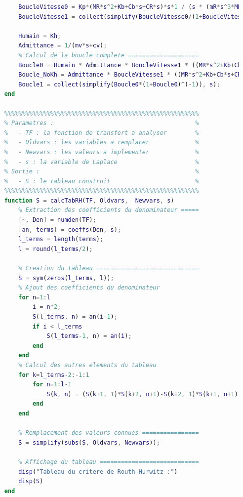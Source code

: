 \documentclass[a4paper,12pt]{article}
\begin{document}
\begin{lstlisting}[caption={Fichier de calculs des plages de $K_p$ et $K_H$}, language=Matlab]
        % Calcul de la boucle de vitesse ==================
        BoucleVitesse0 = Kp*(MR*s^2+Kb+Cb*s+CR*s)*s*1 / (s * (mR*s^3*MR + mR*s*Kb + mR*s^2*Cb + mR*s^2*CR + Kb*MR*s + Kb*CR + Cb*s^2*MR + Cb*s*CR) * (T*s+1));
        BoucleVitesse1 = collect(simplify(BoucleVitesse0/(1+BoucleVitesse0)), s);
        
        Humain = Kh;
        Admittance = 1/(mv*s+cv);
        % Calcul de la boucle complete ====================
        Boucle0 = Humain * Admittance * BoucleVitesse1 * ((MR*s^2+Kb+Cb*s+CR*s)*s)^(-1) * (Kb+Cb*s);
        Boucle_NoKh = Admittance * BoucleVitesse1 * ((MR*s^2+Kb+Cb*s+CR*s)*s)^(-1) * (Kb+Cb*s);
        Boucle1 = collect(simplify(Boucle0*(1+Boucle0)^(-1)), s);
    end
    
    %%%%%%%%%%%%%%%%%%%%%%%%%%%%%%%%%%%%%%%%%%%%%%%%%%%%%%%
    % Parametres :                                        %
    %   - TF : la fonction de transfert a analyser        %
    %   - Oldvars : les variables a remplacer             %
    %   - Newvars : les valeurs a implementer             %
    %   - s : la variable de Laplace                      %
    % Sortie :                                            %
    %   - S : le tableau construit                        %
    %%%%%%%%%%%%%%%%%%%%%%%%%%%%%%%%%%%%%%%%%%%%%%%%%%%%%%%
    function S = calcTabRH(TF, Oldvars,  Newvars, s)
        % Extraction des coefficients du denominateur =====
        [~, Den] = numden(TF);
        [an, terms] = coeffs(Den, s);
        l_terms = length(terms);
        l = round(l_terms/2);

        % Creation du tableau =============================
        S = sym(zeros(l_terms, l));
        % Ajout des coefficients du denominateur
        for n=1:l
            i = n*2;
            S(l_terms, n) = an(i-1);
            if i < l_terms
                S(l_terms-1, n) = an(i);
            end
        end
        % Calcul des autres elements du tableau
        for k=l_terms-2:-1:1
            for n=1:l-1
                S(k, n) = (S(k+1, 1)*S(k+2, n+1)-S(k+2, 1)*S(k+1, n+1))/S(k+1, 1);
            end
        end

        % Remplacement des valeurs connues ================
        S = simplify(subs(S, Oldvars, Newvars));

        % Affichage du tableau ============================
        disp("Tableau du critere de Routh-Hurwitz :")
        disp(S)
    end
    \end{lstlisting}
\end{document}
